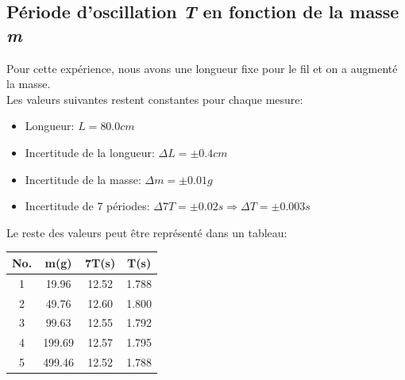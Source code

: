 \documentclass[12pt,a4paper]{article}
\begin{document}
    \subsection{Période d'oscillation \textit{T} en fonction de la masse \textit{m}}
    Pour cette expérience, nous avons une longueur fixe pour le fil et on a augmenté la masse. \\
    Les valeurs suivantes restent constantes pour chaque mesure:
    \begin{itemize}
        \item Longueur: $L=80.0cm$
        \item Incertitude de la longueur: $\Delta L=\pm 0.4cm$
        \item Incertitude de la masse: $\Delta m=\pm 0.01g$
        \item Incertitude de 7 périodes: $\Delta 7T=\pm 0.02s \Rightarrow \Delta T=\pm 0.003s$
    \end{itemize}
    Le reste des valeurs peut être représenté dans un tableau:
    \begin{table}[htbp]
        \centering
        \begin{minipage}{0.4\textwidth}
            \begin{tabular}{c|c|c|c}
                \textbf{No.} & \textbf{m(g)} & \textbf{7T(s)} & \textbf{T(s)} \\
                \toprule
                1 & 19.96 & 12.52 & 1.788 \\
                2 & 49.76 & 12.60 & 1.800 \\
                3 & 99.63 & 12.55 & 1.792 \\
                4 & 199.69 & 12.57 & 1.795 \\
                5 & 499.46 & 12.52 & 1.788 \\
            \end{tabular}
        \end{minipage}%
        \begin{minipage}{0.6\textwidth}
            \centering
        \end{minipage}
    \end{table} \\
\end{document}
